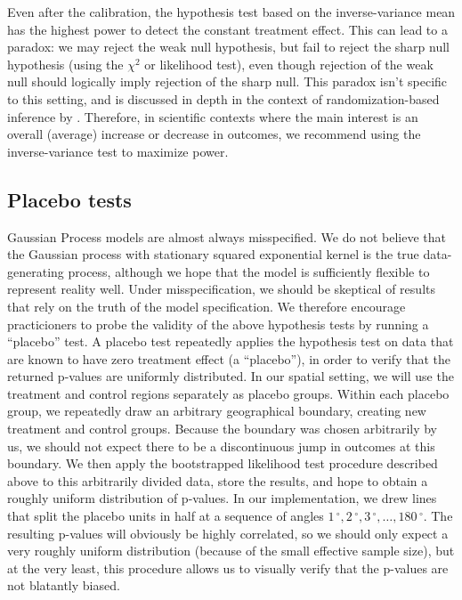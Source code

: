\documentclass[letter]{article}
\newcommand{\degree}{{\,^\circ}}
\renewcommand{\cite}[1]{\citep{#1}}
\begin{document}
Even after the calibration, the hypothesis test based on the inverse-variance mean has the highest power to detect the constant treatment effect. This can lead to a paradox: we may reject the weak null hypothesis, but fail to reject the sharp null hypothesis (using the \(\chi^2\) or likelihood test), even though rejection of the weak null should logically imply rejection of the sharp null. This paradox isn't specific to this setting, and is discussed in depth in the context of randomization-based inference by \cite{Ding:2014sf}. Therefore, in scientific contexts where the main interest is an overall (average) increase or decrease in outcomes, we recommend using the inverse-variance test to maximize power.
    


    	\subsection{Placebo tests}\label{placebo-tests}
    

\label{sec:placebo}
    	Gaussian Process models are almost always misspecified.
We do not believe that the Gaussian process with stationary squared exponential kernel is the true data-generating process, although we hope that the model is sufficiently flexible to represent reality well.
Under misspecification, we should be skeptical of results that rely on the truth of the model specification.
We therefore encourage practicioners to probe the validity of the above hypothesis tests by running a ``placebo'' test.
A placebo test repeatedly applies the hypothesis test on data that are known to have zero treatment effect (a ``placebo''),
in order to verify that the returned p-values are uniformly distributed.
In our spatial setting, we will use the treatment and control regions separately as placebo groups.
Within each placebo group, we repeatedly draw an arbitrary geographical boundary, creating new treatment and control groups.
Because the boundary was chosen arbitrarily by us, we should not expect there to be a discontinuous jump in outcomes at this boundary.
We then apply the bootstrapped likelihood test procedure described above to this arbitrarily divided data, store the results, and hope to obtain a roughly uniform distribution of p-values.
In our implementation, we drew lines that split the placebo units in half at a sequence of angles \(1\degree,2\degree,3\degree,\ldots,180\degree\).
The resulting p-values will obviously be highly correlated, so we should only expect a very roughly uniform distribution (because of the small effective sample size), but at the very least, this procedure allows us to visually verify that the p-values are not blatantly biased.
    
\end{document}
